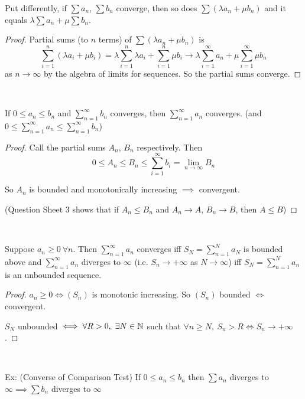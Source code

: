 Put differently, if $\sum a_n$, $\sum b_n$ converge, then so does $\sum (\lambda a_n + \mu b_n)$ and it equals $\lambda \sum a_n + \mu \sum b_n$. 


\begin{proof}
Partial sums (to $n$ terms) of $\sum (\lambda a_n + \mu b_n)$ is 
\[\sum_{i=1}^{n} (\lambda a_i + \mu b_i) = \lambda \sum_{i=1}^{n} \lambda a_i + \sum_{i=1}^{n} \mu b_i \to \lambda \sum_{i=1}^{\infty} a_n + \mu \sum_{i=1}^{\infty} \mu b_n \]
as $n \to \infty$ by the algebra of limits for sequences. So the partial sums converge.
\end{proof}~



\begin{theorem}
If $0 \leq a_n \leq b_n$ and $\sum_{n=1}^{\infty} b_n$ converges, then $\sum_{n=1}^{\infty} a_n$ converges.	 (and $0 \leq \sum_{n=1}^{\infty}a_n \leq \sum_{n=1}^{\infty}b_n$)
\end{theorem}

\begin{proof}
Call the partial sums $A_n$, $B_n$ respectively. Then
\[0 \leq A_n \leq B_n \leq \sum_{i=1}^{\infty} b_i = \lim_{n\to \infty}B_n\]	

So $A_n$ is bounded and monotonically increasing $\implies$ convergent.
 
(Question Sheet 3 shows that if $A_n \leq B_n$ and $A_n \to A$, $B_n \to B$, then $A \leq B$)
\end{proof}~


\begin{proposition}
Suppose $a_n \geq 0 ~\forall n$. Then $\sum_{n=1}^{\infty} a_n$ converges iff $S_N = \sum_{n=1}^{N}a_N$ is bounded above and $\sum_{n=1}^{\infty} a_n$ diverges to $\infty$ (i.e. $S_n \to +\infty$ as $N \to \infty$) iff $S_N = \sum_{n=1}^{N} a_n$ is an unbounded sequence. 
\end{proposition}

\begin{proof}
$a_n \geq 0 \iff (S_n)$ is monotonic increasing. So $(S_n)$ bounded $\iff$ convergent.

$S_N$ unbounded $\iff \forall R>0,~ \exists N \in \mathbb{N}$ such that $\forall n \geq N,~ S_n > R \iff S_n \to +\infty$. 
\end{proof}~

Ex: (Converse of Comparison Test)
If $0 \leq a_n \leq b_n$ then $\sum a_n$ diverges to $\infty\implies \sum b_n$ diverges to $\infty$\\


